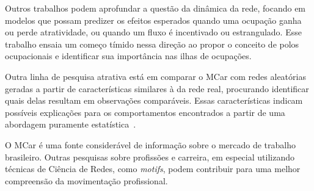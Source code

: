 \documentclass[12pt,a4paper]{article}
\begin{document}
Outros trabalhos podem aprofundar a questão da dinâmica da rede, focando em modelos que possam predizer os efeitos esperados quando uma ocupação ganha ou perde atratividade, ou quando um fluxo é incentivado ou estrangulado. Esse trabalho ensaia um começo tímido nessa direção ao propor o conceito de polos ocupacionais e identificar sua importância nas ilhas de ocupações.

Outra linha de pesquisa atrativa está em comparar o MCar com redes aleatórias geradas a partir de características similares à da rede real, procurando identificar quais delas resultam em observações comparáveis. Essas características indicam possíveis explicações para os comportamentos encontrados a partir de uma abordagem puramente estatística~\cite{Barabasi2016-rn}.

O MCar é uma fonte considerável de informação sobre o mercado de trabalho brasileiro. Outras pesquisas sobre profissões e carreira, em especial utilizando técnicas de Ciência de Redes, como \textit{motifs}, podem contribuir para uma melhor compreensão da movimentação profissional.

\FloatBarrier %

\def\refname{REFERÊNCIAS BIBLIOGRÁFICAS}


\end{document}
